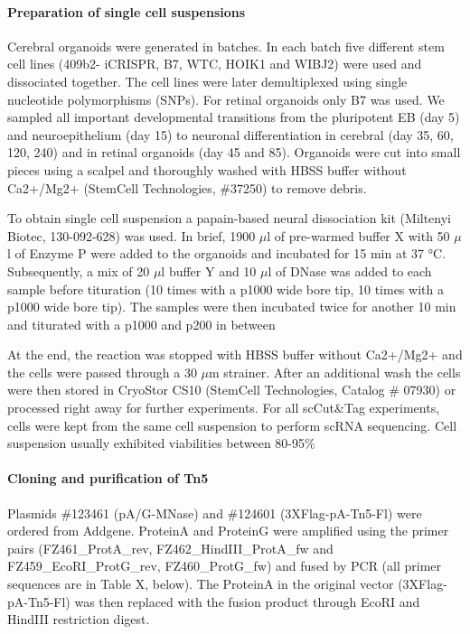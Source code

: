 \paragraph{Preparation of single cell suspensions}
Cerebral organoids were generated in batches. In each batch five different stem cell lines (409b2- iCRISPR, B7, WTC, HOIK1 and WIBJ2) were used and dissociated together. The cell lines were later demultiplexed using single nucleotide polymorphisms (SNPs). For retinal organoids only B7 was used. We sampled all important developmental transitions from the pluripotent EB (day 5) and neuroepithelium (day 15) to neuronal differentiation in cerebral (day 35, 60, 120, 240) and  in retinal organoids (day 45 and 85). Organoids were cut into small pieces using a scalpel and thoroughly washed with HBSS buffer without Ca2+/Mg2+ (StemCell Technologies, \#37250) to remove debris. 

To obtain single cell suspension a papain-based neural dissociation kit (Miltenyi Biotec, 130-092-628) was used. In brief, 1900 $\mu$l of pre-warmed buffer X with 50 $\mu$l of Enzyme P were added to the organoids and incubated for 15 min at 37 °C. Subsequently, a mix of 20 $\mu$l buffer Y and 10 $\mu$l of DNase was added to each sample before tituration (10 times with a p1000 wide bore tip, 10 times with a p1000 wide bore tip). The samples were then incubated twice for another 10 min and titurated with a p1000 and p200 in between
 
At the end, the reaction was stopped with HBSS buffer without Ca2+/Mg2+ and the cells were passed through a 30 $\mu$m strainer. After an additional wash the cells were then stored in CryoStor CS10 (StemCell Technologies, Catalog \# 07930) or processed right away for further experiments. For all scCut\&Tag experiments, cells were kept from the same cell suspension to perform scRNA sequencing. Cell suspension usually exhibited viabilities between 80-95\%

\paragraph{Cloning and purification of Tn5}
Plasmids \#123461 (pA/G-MNase) and \#124601 (3XFlag-pA-Tn5-Fl) were ordered from Addgene. ProteinA and ProteinG were amplified using the primer pairs (FZ461\_ProtA\_rev,  
FZ462\_HindIII\_ProtA\_fw and FZ459\_EcoRI\_ProtG\_rev, FZ460\_ProtG\_fw) and fused by PCR (all primer sequences are in Table X, below). The ProteinA in the original vector (3XFlag-pA-Tn5-Fl)  was then replaced with the fusion product through EcoRI and HindIII restriction digest. 

